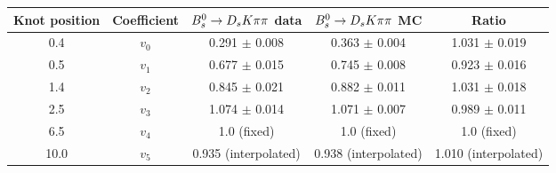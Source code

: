 \begin{tabular}{c c c c c}
\hline
\hline
Knot position & Coefficient & ${{B}^0_{s}}\rightarrow{\ensuremath{{D}_{s}}}{\ensuremath{K}}{\ensuremath{\pi}}{\ensuremath{\pi}}$ data & ${{B}^0_{s}}\rightarrow{\ensuremath{{D}_{s}}}{\ensuremath{K}}{\ensuremath{\pi}}{\ensuremath{\pi}}$ MC & Ratio \\
\hline
0.4 & $v_{0}$ & 0.291 $\pm$ 0.008 & 0.363 $\pm$ 0.004 & 1.031 $\pm$ 0.019\\
0.5 & $v_{1}$ & 0.677 $\pm$ 0.015 & 0.745 $\pm$ 0.008 & 0.923 $\pm$ 0.016\\
1.4 & $v_{2}$ & 0.845 $\pm$ 0.021 & 0.882 $\pm$ 0.011 & 1.031 $\pm$ 0.018\\
2.5 & $v_{3}$ & 1.074 $\pm$ 0.014 & 1.071 $\pm$ 0.007 & 0.989 $\pm$ 0.011\\
6.5 & $v_{4}$ &  1.0 (fixed) & 1.0 (fixed) & 1.0 (fixed)\\
10.0 & $v_{5}$ & 0.935 (interpolated) & 0.938 (interpolated) & 1.010 (interpolated) \\
\hline
\hline
\end{tabular}
